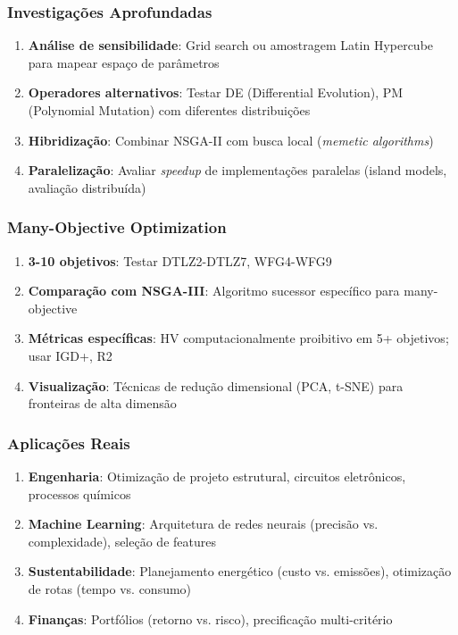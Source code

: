 \subsubsection{Investigações Aprofundadas}

\begin{enumerate}
    \item \textbf{Análise de sensibilidade}: Grid search ou amostragem Latin Hypercube para mapear espaço de parâmetros
    
    \item \textbf{Operadores alternativos}: Testar DE (Differential Evolution), PM (Polynomial Mutation) com diferentes distribuições
    
    \item \textbf{Hibridização}: Combinar NSGA-II com busca local (\textit{memetic algorithms})
    
    \item \textbf{Paralelização}: Avaliar \textit{speedup} de implementações paralelas (island models, avaliação distribuída)
\end{enumerate}

\subsubsection{Many-Objective Optimization}

\begin{enumerate}
    \item \textbf{3-10 objetivos}: Testar DTLZ2-DTLZ7, WFG4-WFG9
    
    \item \textbf{Comparação com NSGA-III}: Algoritmo sucessor específico para many-objective
    
    \item \textbf{Métricas específicas}: HV computacionalmente proibitivo em 5+ objetivos; usar IGD+, R2
    
    \item \textbf{Visualização}: Técnicas de redução dimensional (PCA, t-SNE) para fronteiras de alta dimensão
\end{enumerate}

\subsubsection{Aplicações Reais}

\begin{enumerate}
    \item \textbf{Engenharia}: Otimização de projeto estrutural, circuitos eletrônicos, processos químicos
    
    \item \textbf{Machine Learning}: Arquitetura de redes neurais (precisão vs. complexidade), seleção de features
    
    \item \textbf{Sustentabilidade}: Planejamento energético (custo vs. emissões), otimização de rotas (tempo vs. consumo)
    
    \item \textbf{Finanças}: Portfólios (retorno vs. risco), precificação multi-critério
\end{enumerate}

